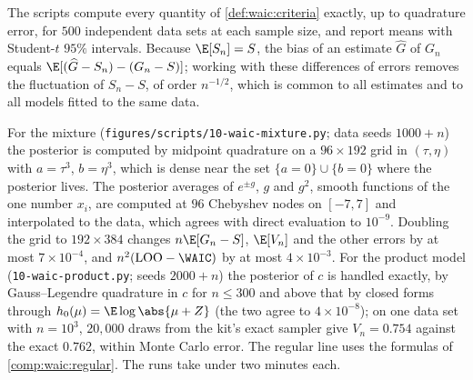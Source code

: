 \begin{refsection}
The scripts compute every quantity of \cref{def:waic:criteria} exactly, up to quadrature error, for $500$ independent data sets at each sample size, and report means with Student-$t$ $95\%$ intervals. Because $\E[S_n]=S$, the bias of an estimate $\widehat G$ of $G_n$ equals $\E[(\widehat G-S_n)-(G_n-S)]$; working with these differences of errors removes the fluctuation of $S_n-S$, of order $n^{-1/2}$, which is common to all estimates and to all models fitted to the same data.

For the mixture (\texttt{figures/scripts/10-waic-mixture.py}; data seeds $1000+n$) the posterior is computed by midpoint quadrature on a $96\times192$ grid in $(\tau,\eta)$ with $a=\tau^3$, $b=\eta^3$, which is dense near the set $\{a=0\}\cup\{b=0\}$ where the posterior lives. The posterior averages of $e^{\pm g}$, $g$ and $g^2$, smooth functions of the one number $x_i$, are computed at $96$ Chebyshev nodes on $[-7,7]$ and interpolated to the data, which agrees with direct evaluation to $10^{-9}$. Doubling the grid to $192\times384$ changes $n\E[G_n-S]$, $\E[V_n]$ and the other errors by at most $7\times10^{-4}$, and $n^2(\waicLOO-\WAIC)$ by at most $4\times10^{-3}$. For the product model (\texttt{10-waic-product.py}; seeds $2000+n$) the posterior of $c$ is handled exactly, by Gauss--Legendre quadrature in $c$ for $n\le300$ and above that by closed forms through $h_0(\mu)=\E\log\abs{\mu+Z}$ (the two agree to $4\times10^{-8}$); on one data set with $n=10^3$, $20{,}000$ draws from the kit's exact sampler give $V_n=0.754$ against the exact $0.762$, within Monte Carlo error. The regular line uses the formulas of \cref{comp:waic:regular}. The runs take under two minutes each.


\end{refsection}
